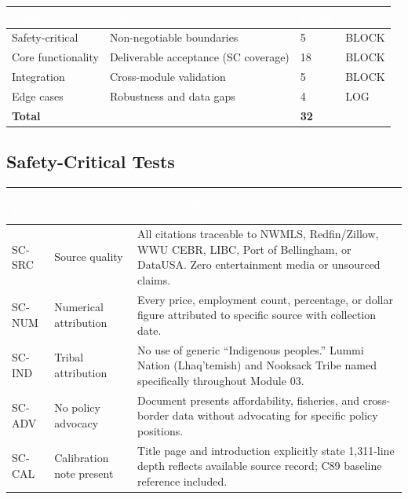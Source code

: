 \documentclass[11pt,letterpaper]{article}
\newcommand{\tableheader}[1]{\textbf{\sffamily\textcolor{white}{#1}}}
\begin{document}
\begin{center}
\begin{tabularx}{\textwidth}{L{3cm}XC{2cm}C{2cm}}
\toprule
{}
\tableheader{Category} & \tableheader{Purpose} & \tableheader{Count} & \tableheader{Action} \\
\midrule
Safety-critical & Non-negotiable boundaries & 5 & BLOCK \\
Core functionality & Deliverable acceptance (SC coverage) & 18 & BLOCK \\
Integration & Cross-module validation & 5 & BLOCK \\
Edge cases & Robustness and data gaps & 4 & LOG \\
\midrule
\textbf{Total} & & \textbf{32} & \\
\bottomrule
\end{tabularx}
\end{center}

\subsection{Safety-Critical Tests}

\begin{center}
\begin{tabularx}{\textwidth}{C{1.5cm}L{3.5cm}X}
\toprule
{}
\tableheader{Test ID} & \tableheader{Verifies} & \tableheader{Expected Behavior} \\
\midrule
SC-SRC & Source quality & All citations traceable to NWMLS, Redfin/Zillow, WWU CEBR, LIBC, Port of Bellingham, or DataUSA. Zero entertainment media or unsourced claims. \\
SC-NUM & Numerical attribution & Every price, employment count, percentage, or dollar figure attributed to specific source with collection date. \\
SC-IND & Tribal attribution & No use of generic ``Indigenous peoples.'' Lummi Nation (Lhaq'temish) and Nooksack Tribe named specifically throughout Module 03. \\
SC-ADV & No policy advocacy & Document presents affordability, fisheries, and cross-border data without advocating for specific policy positions. \\
SC-CAL & Calibration note present & Title page and introduction explicitly state 1,311-line depth reflects available source record; C89 baseline reference included. \\
\bottomrule
\end{tabularx}
\end{center}
\end{document}
